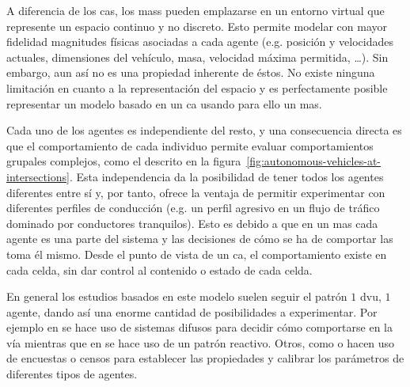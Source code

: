 A diferencia de los \acp{ca}, los \acp{mas} pueden emplazarse en un entorno virtual que represente un espacio continuo y no discreto. Esto permite modelar con mayor fidelidad magnitudes físicas asociadas a cada agente (e.g. posición y velocidades actuales, dimensiones del vehículo, masa, velocidad máxima permitida, \ldots). Sin embargo, aun así no es una propiedad inherente de éstos. No existe ninguna limitación en cuanto a la representación del espacio y es perfectamente posible representar un modelo basado en un \ac{ca} usando para ello un \ac{mas}.

Cada uno de los agentes es independiente del resto, y una consecuencia directa es que el comportamiento de cada individuo permite evaluar comportamientos grupales complejos, como el descrito en la figura~\ref{fig:autonomous-vehicles-at-intersections}. Esta independencia da la posibilidad de tener todos los agentes diferentes entre sí y, por tanto, ofrece la ventaja de permitir experimentar con diferentes perfiles de conducción (e.g. un perfil agresivo en un flujo de tráfico dominado por conductores tranquilos). Esto es debido a que en un \ac{mas} cada agente es una parte del sistema y las decisiones de cómo se ha de comportar las toma él mismo. Desde el punto de vista de un \ac{ca}, el comportamiento existe en cada celda, sin dar control al contenido o estado de cada celda.

En general los estudios basados en este modelo suelen seguir el patrón $1$ \ac{dvu}, $1$ agente, dando así una enorme cantidad de posibilidades a experimentar. Por ejemplo en \cite{Das} se hace uso de sistemas difusos para decidir cómo comportarse en la vía mientras que en \cite{Ehlert2001} se hace uso de un patrón reactivo. Otros, como \cite{Dia2002} o \cite{Balmer} hacen uso de encuestas o censos para establecer las propiedades y calibrar los parámetros de diferentes tipos de agentes.

